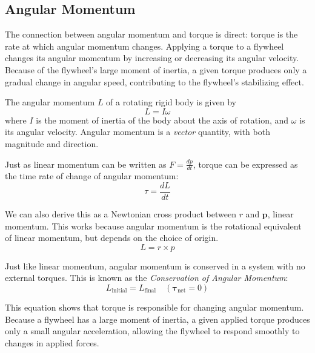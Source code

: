 \subsection{Angular Momentum}
The connection between angular momentum and torque is direct: torque is the rate at which angular momentum changes. Applying a torque to a flywheel changes its angular momentum by increasing or decreasing its angular velocity. Because of the flywheel's large moment of inertia, a given torque produces only a gradual change in angular speed, contributing to the flywheel's stabilizing effect.
\begin{mdframed}[frametitle = {Angular Momentum and the Conservation of Angular Momentum}, style = important]
The angular momentum \( L \) of a rotating rigid body is given by
\begin{equation}
L = I \omega
\label{eq:angularMomentum1}
\end{equation}
where \( I \) is the moment of inertia of the body about the axis of rotation, and \( \omega \) is its angular velocity. Angular momentum is a \emph{vector} quantity, with both magnitude and direction.

Just as linear momentum can be written as $F=\frac{dp}{dt}$, torque can be expressed as the time rate of change of angular momentum:
\begin{equation}
\tau = \frac{dL}{dt}
\label{eq:derivTorque}
\end{equation}

We can also derive this as a Newtonian cross product between $r$ and $\textbf{p}$, linear momentum. This works because angular momentum is the rotational equivalent of linear momentum, but depends on the choice of origin.
\begin{equation}
L = r \times p
\label{eq:angularMomentum2}
\end{equation}

Just like linear momentum, angular momentum is conserved in a system with no external torques. This is known as the \emph{Conservation of Angular Momentum}:
\begin{equation}
L_{\text{initial}} = L_{\text{final}} \quad (\boldsymbol{\tau}_{\text{net}} = 0)
\end{equation}

\end{mdframed}

This equation shows that torque is responsible for changing angular momentum. Because a flywheel has a large moment of inertia, a given applied torque produces only a small angular acceleration, allowing the flywheel to respond smoothly to changes in applied forces. 

